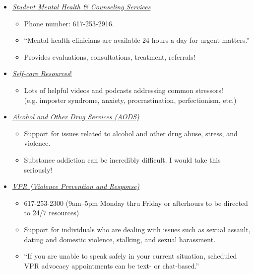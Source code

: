 \documentclass[11pt, a4paper]{article}
\begin{document}
\begin{itemize}
    \item \href{https://medical.mit.edu/services/mental-health-counseling/at-a-glance}{\textit{Student Mental Health \& Counseling Services}}
    
    \begin{itemize}
        \item Phone number: 617-253-2916. 
        \item ``Mental health clinicians are available 24 hours a day for urgent matters.''
        
        \item Provides evaluations, consultations, treatment, referrals!
    \end{itemize}
    
    \item \href{https://medical.mit.edu/services/mental-health-counseling/self-care-resources}{\textit{Self-care Resources}!}
    
    \begin{itemize}
        \item Lots of helpful videos and podcasts addressing common stressors! \\ (e.g. imposter syndrome, anxiety, procrastination, perfectionism, etc.)
    \end{itemize}
    
    \item \href{https://studentlife.mit.edu/aods#}{\textit{Alcohol and Other Drug Services (AODS)}}
    
    \begin{itemize}
        \item Support for issues related to alcohol and other drug abuse, stress, and violence.
        \item Substance addiction can be incredibly difficult. I would take this seriously!
    \end{itemize}
    
    \item \href{https://studentlife.mit.edu/vpr}{\textit{VPR (Violence Prevention and Response)}}
    
    \begin{itemize}
        \item 617-253-2300 (9am--5pm Monday thru Friday or afterhours to be directed to 24/7 resources)
       \item Support for individuals who are dealing with issues such as sexual assault, dating and domestic violence, stalking, and sexual harassment. 
    \item ``If you are unable to speak safely in your current situation, scheduled VPR advocacy appointments can be text- or chat-based.''
     

\end{itemize}
\end{itemize}
\end{document}
